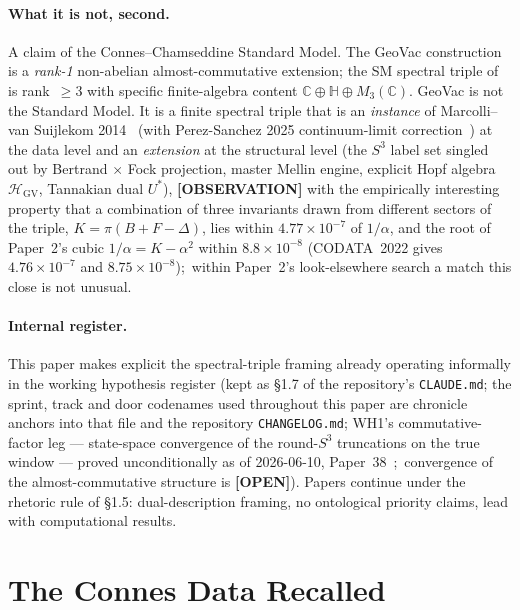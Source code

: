 \documentclass[11pt]{article}
\begin{document}
\paragraph{What it is not, second.}  A claim of the
Connes--Chamseddine Standard Model.  The GeoVac construction is a
\emph{rank-1} non-abelian almost-commutative extension; the SM
spectral triple of \cite{chamseddine_connes1997_2008} is rank~$\ge 3$ with
specific finite-algebra content $\mathbb{C} \oplus \mathbb{H} \oplus
M_3(\mathbb{C})$.  GeoVac is not the Standard Model.  It is a finite
spectral triple that is an \emph{instance} of Marcolli--van Suijlekom 2014~\cite{marcolli_vs2014} (with Perez-Sanchez 2025 continuum-limit correction~\cite{perez_sanchez2025}) at the data level and an \emph{extension} at the structural level (the $S^3$ label set singled out by Bertrand $\times$ Fock projection, master Mellin engine, explicit Hopf algebra $\mathcal{H}_{\mathrm{GV}}$, Tannakian dual $U^*$), \textbf{[OBSERVATION]} with the empirically interesting
property that a combination of three invariants drawn from different
sectors of the triple, $K = \pi(B + F - \Delta)$, lies within
$4.77 \times 10^{-7}$ of $1/\alpha$, and the root of Paper~2's cubic
$1/\alpha = K - \alpha^2$ within $8.8\times 10^{-8}$ (CODATA~2022 gives
$4.76 \times 10^{-7}$ and $8.75 \times 10^{-8}$);\ within Paper~2's
look-elsewhere search a match this close is not unusual.

\paragraph{Internal register.}  This paper makes explicit the
spectral-triple framing already operating informally in the working
hypothesis register (kept as \S 1.7 of the repository's \texttt{CLAUDE.md}; the sprint, track and door codenames used throughout this paper are chronicle anchors into that file and the repository \texttt{CHANGELOG.md}; WH1's commutative-factor leg --- state-space convergence of the round-$S^3$ truncations on the true window --- proved unconditionally as of 2026-06-10, Paper~38~\cite{loutey_paper38};\ convergence of the almost-commutative structure is \textbf{[OPEN]}).
Papers continue under the rhetoric rule of \S 1.5: dual-description
framing, no ontological priority claims, lead with computational
results.

\section{The Connes Data Recalled}
\label{sec:connes_data}
\end{document}
